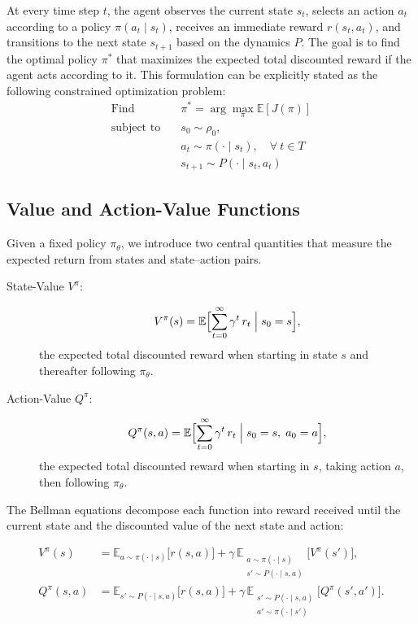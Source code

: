 At every time step \(t\), the agent observes the current state \(s_t\), selects an action \(a_t\) according to a policy \(\pi(a_t\mid s_t)\), receives an immediate reward \(r(s_t,a_t)\), and transitions to the next state \(s_{t+1}\) based on the dynamics \(P\). The goal is to find the optimal policy \(\pi^*\) that maximizes the expected total discounted reward if the agent acts according to it. This formulation can be explicitly stated as the following constrained optimization problem:
\begin{equation}\label{eq:RL_opt}
\begin{aligned}
\text{Find} \quad & \pi^* = \arg\max_{\pi} \mathbb{E}\left[J(\pi)\right] \\
\text{subject to} \quad & s_0 \sim \rho_0, \\
& a_t \sim \pi(\cdot \mid s_t), \quad \forall\ t \in T \\
& s_{t+1} \sim P(\cdot \mid s_t, a_t)
\end{aligned}
\end{equation}

\subsection{Value and Action-Value Functions}

Given a fixed policy \(\pi_\theta\), we introduce two central quantities that measure the expected return from states and state–action pairs.

\begin{description}
  \item[State-Value \(V^\pi\):]
    \[
      V^\pi(s)
      = \mathbb{E}\Bigl[\sum_{t=0}^{\infty}\gamma^t\,r_t
      \;\Big|\;s_0 = s\Bigr],
    \]
    the expected total discounted reward when starting in state \(s\) and thereafter following \(\pi_\theta\).
  
  \item[Action-Value \(Q^\pi\):]
    \[
      Q^\pi(s,a)
      = \mathbb{E}\Bigl[\sum_{t=0}^{\infty}\gamma^t\,r_t
      \;\Big|\;s_0 = s,\;a_0 = a\Bigr],
    \]
    the expected total discounted reward when starting in \(s\), taking action \(a\), then following \(\pi_\theta\).
\end{description}

The Bellman equations decompose each function into reward received until the current state and the discounted value of the next state and action:

\begin{align}
\label{eq:BellmanV}
V^\pi(s)
&= \mathbb{E}_{a\sim\pi(\cdot\mid s)}\bigl[r(s,a)\bigr]
  + \gamma\,\mathbb{E}_{\substack{a\sim\pi(\cdot\mid s)\\s'\sim P(\cdot\mid s,a)}}\bigl[V^\pi(s')\bigr],\\[4pt]
\label{eq:BellmanQ}
Q^\pi(s,a)
&= \mathbb{E}_{s'\sim P(\cdot\mid s,a)}\bigl[r(s,a)\bigr]
  + \gamma\,\mathbb{E}_{\substack{s'\sim P(\cdot\mid s,a)\\a'\sim\pi(\cdot\mid s')}}\bigl[Q^\pi(s',a')\bigr].
\end{align}

